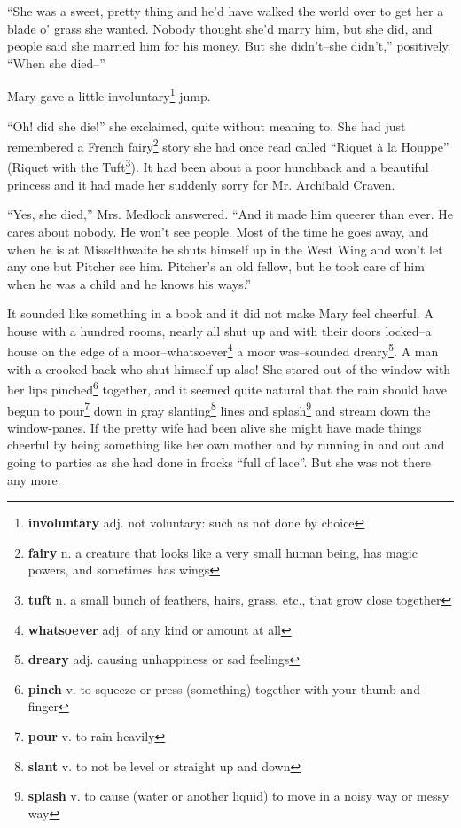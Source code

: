 ``She was a sweet, pretty thing and he'd have walked the world over to get her a blade o' grass she wanted. Nobody thought she'd marry him, but she did, and people said she married him for his money. But she didn't--she didn't,'' positively. ``When she died--''

Mary gave a little involuntary\footnote{\textbf{involuntary} adj. not voluntary: such as not done by choice} jump.

``Oh! did she die!'' she exclaimed, quite without meaning to. She had just remembered a French fairy\footnote{\textbf{fairy} n. a creature that looks like a very small human being, has magic powers, and sometimes has wings} story she had once read called ``Riquet \`{a} la Houppe'' (Riquet with the Tuft\footnote{\textbf{tuft} n. a small bunch of feathers, hairs, grass, etc., that grow close together}). It had been about a poor hunchback and a beautiful princess and it had made her suddenly sorry for Mr. Archibald Craven.

``Yes, she died,'' Mrs. Medlock answered. ``And it made him queerer than ever. He cares about nobody. He won't see people. Most of the time he goes away, and when he is at Misselthwaite he shuts himself up in the West Wing and won't let any one but Pitcher see him. Pitcher's an old fellow, but he took care of him when he was a child and he knows his ways.''

It sounded like something in a book and it did not make Mary feel cheerful. A house with a hundred rooms, nearly all shut up and with their doors locked--a house on the edge of a moor--whatsoever\footnote{\textbf{whatsoever} adj. of any kind or amount at all} a moor was--sounded dreary\footnote{\textbf{dreary} adj. causing unhappiness or sad feelings}. A man with a crooked back who shut himself up also! She stared out of the window with her lips pinched\footnote{\textbf{pinch} v. to squeeze or press (something) together with your thumb and finger} together, and it seemed quite natural that the rain should have begun to pour\footnote{\textbf{pour} v. to rain heavily} down in gray slanting\footnote{\textbf{slant} v. to not be level or straight up and down} lines and splash\footnote{\textbf{splash} v. to cause (water or another liquid) to move in a noisy way or messy way} and stream down the window-panes. If the pretty wife had been alive she might have made things cheerful by being something like her own mother and by running in and out and going to parties as she had done in frocks ``full of lace''. But she was not there any more.

